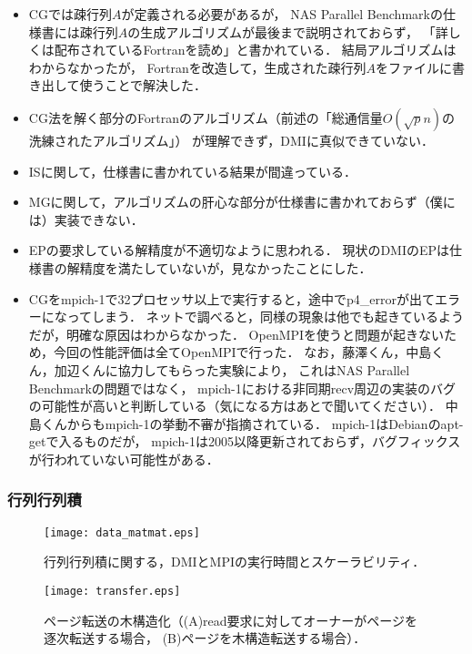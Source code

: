 \documentclass[10pt]{jsarticle}
\begin{document}
\begin{itemize}
\item CGでは疎行列$A$が定義される必要があるが，
  NAS Parallel Benchmarkの仕様書には疎行列$A$の生成アルゴリズムが最後まで説明されておらず，
  「詳しくは配布されているFortranを読め」と書かれている．
  結局アルゴリズムはわからなかったが，
  Fortranを改造して，生成された疎行列$A$をファイルに書き出して使うことで解決した．
\item CG法を解く部分のFortranのアルゴリズム（前述の「総通信量$O(\sqrt pn)$の洗練されたアルゴリズム」）
  が理解できず，DMIに真似できていない．
\item ISに関して，仕様書に書かれている結果が間違っている．
\item MGに関して，アルゴリズムの肝心な部分が仕様書に書かれておらず（僕には）実装できない．
\item EPの要求している解精度が不適切なように思われる．
  現状のDMIのEPは仕様書の解精度を満たしていないが，見なかったことにした．
\item CGをmpich-1で32プロセッサ以上で実行すると，途中でp4\_errorが出てエラーになってしまう．
  ネットで調べると，同様の現象は他でも起きているようだが，明確な原因はわからなかった．
  OpenMPIを使うと問題が起きないため，今回の性能評価は全てOpenMPIで行った．
  なお，藤澤くん，中島くん，加辺くんに協力してもらった実験により，
  これはNAS Parallel Benchmarkの問題ではなく，
  mpich-1における非同期recv周辺の実装のバグの可能性が高いと判断している（気になる方はあとで聞いてください）．
  中島くんからもmpich-1の挙動不審が指摘されている．
  mpich-1はDebianのapt-getで入るものだが，
  mpich-1は2005以降更新されておらず，バグフィックスが行われていない可能性がある．
\end{itemize}

\subsubsection{行列行列積}
\label{sec:perform_mm}

\begin{figure}
  \centering
  \texttt{[image: data\_matmat.eps]}
  \caption{行列行列積に関する，DMIとMPIの実行時間とスケーラビリティ．}
  \label{fig:data_matmat}
\end{figure}

\begin{figure}
  \centering
  \texttt{[image: transfer.eps]}
  \caption{ページ転送の木構造化（(A)read要求に対してオーナーがページを逐次転送する場合，
    (B)ページを木構造転送する場合）．}
  \label{fig:transfer}
\end{figure}
\end{document}
